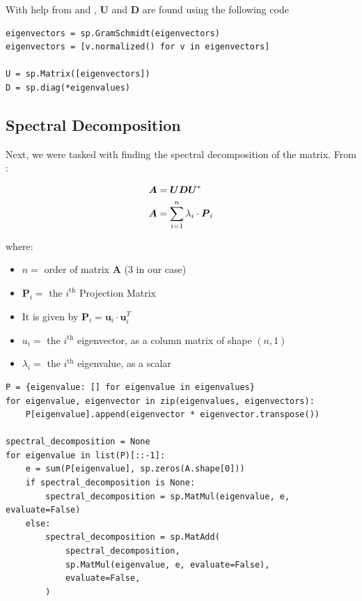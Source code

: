 \documentclass{report}
\begin{document}
With help from \cite{enwiki:Diagonalization} and \cite{enwiki:Gram_Schmidt}, $\boldsymbol{U}$ and $\boldsymbol{D}$ are found using the following code
\newline

\begin{lstlisting}[caption={Finding $\boldsymbol{U}$ and $\boldsymbol{D}$}]
eigenvectors = sp.GramSchmidt(eigenvectors)
eigenvectors = [v.normalized() for v in eigenvectors]

U = sp.Matrix([eigenvectors])
D = sp.diag(*eigenvalues)
\end{lstlisting}

\subsection{Spectral Decomposition}
Next, we were tasked with finding the spectral decomposition of the matrix. From \cite{enwiki:Eigendecomposition}:

\begin{align}
    \boldsymbol{A} & = \boldsymbol{U}\boldsymbol{D}\boldsymbol{U}^* \notag                                     \\
    \boldsymbol{A} & = \sum_{i=1}^{n}{\lambda_{i} \cdot \boldsymbol{P}_i} \label{eq:spectral_decompostion_sum}
\end{align}

where:
\begin{itemize}
    \item  $n = $ order of matrix $\boldsymbol{A} $ (3 in our case)
    \item $\boldsymbol{P} _{i}=$ the $i^\text{th}$ Projection Matrix
    \item[] \quad \quad It is given by $\boldsymbol{P}_{i} = \boldsymbol{u}_i \cdot \boldsymbol{u}_i ^ {T}$
    \item $u_{i} = $ the $i^\text{th}$ eigenvector, as a column matrix of shape $(n,1)$
    \item $\lambda_{i} = $ the $i^\text{th}$ eigenvalue, as a scalar
\end{itemize}

\begin{lstlisting}[caption={Implementation for Equation \ref{eq:spectral_decompostion_sum}}]
P = {eigenvalue: [] for eigenvalue in eigenvalues}
for eigenvalue, eigenvector in zip(eigenvalues, eigenvectors):
    P[eigenvalue].append(eigenvector * eigenvector.transpose())

spectral_decomposition = None
for eigenvalue in list(P)[::-1]:
    e = sum(P[eigenvalue], sp.zeros(A.shape[0]))
    if spectral_decomposition is None:
        spectral_decomposition = sp.MatMul(eigenvalue, e, evaluate=False)
    else:
        spectral_decomposition = sp.MatAdd(
            spectral_decomposition,
            sp.MatMul(eigenvalue, e, evaluate=False),
            evaluate=False,
        )
\end{lstlisting}
\end{document}
